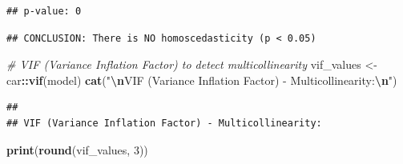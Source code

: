 \documentclass[
]{article}
\newenvironment{Shaded}{\begin{snugshade}}{\end{snugshade}}
\newcommand{\CommentTok}[1]{\textcolor[rgb]{0.56,0.35,0.01}{\textit{#1}}}
\newcommand{\ControlFlowTok}[1]{\textcolor[rgb]{0.13,0.29,0.53}{\textbf{#1}}}
\newcommand{\DecValTok}[1]{\textcolor[rgb]{0.00,0.00,0.81}{#1}}
\newcommand{\FloatTok}[1]{\textcolor[rgb]{0.00,0.00,0.81}{#1}}
\newcommand{\FunctionTok}[1]{\textcolor[rgb]{0.13,0.29,0.53}{\textbf{#1}}}
\newcommand{\NormalTok}[1]{#1}
\newcommand{\OtherTok}[1]{\textcolor[rgb]{0.56,0.35,0.01}{#1}}
\newcommand{\SpecialCharTok}[1]{\textcolor[rgb]{0.81,0.36,0.00}{\textbf{#1}}}
\newcommand{\StringTok}[1]{\textcolor[rgb]{0.31,0.60,0.02}{#1}}
\begin{document}
\begin{Shaded}
\end{Shaded}

\begin{verbatim}
## p-value: 0
\end{verbatim}

\begin{Shaded}
\end{Shaded}

\begin{verbatim}
## CONCLUSION: There is NO homoscedasticity (p < 0.05)
\end{verbatim}

\begin{Shaded}
\begin{Highlighting}[]
\CommentTok{\# VIF (Variance Inflation Factor) to detect multicollinearity}
\NormalTok{vif\_values }\OtherTok{\textless{}{-}}\NormalTok{ car}\SpecialCharTok{::}\FunctionTok{vif}\NormalTok{(model)}
\FunctionTok{cat}\NormalTok{(}\StringTok{"}\SpecialCharTok{\textbackslash{}n}\StringTok{VIF (Variance Inflation Factor) {-} Multicollinearity:}\SpecialCharTok{\textbackslash{}n}\StringTok{"}\NormalTok{)}
\end{Highlighting}
\end{Shaded}

\begin{verbatim}
## 
## VIF (Variance Inflation Factor) - Multicollinearity:
\end{verbatim}

\begin{Shaded}
\begin{Highlighting}[]
\FunctionTok{print}\NormalTok{(}\FunctionTok{round}\NormalTok{(vif\_values, }\DecValTok{3}\NormalTok{))}
\end{Highlighting}
\end{Shaded}
\end{document}
